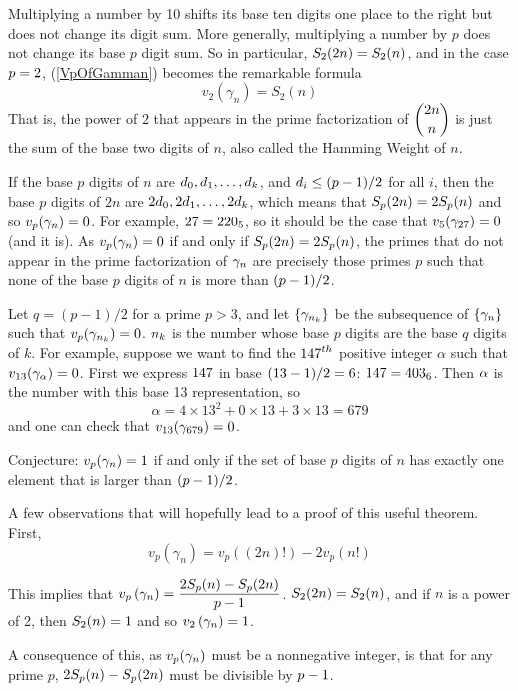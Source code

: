 Multiplying a number by 10 shifts its base ten digits one place to the right but does not change its digit sum. More generally, multiplying a number by $p$ does not change its base $p$ digit sum. So in particular, $\displaystyle S_2(2n) = S_2(n)$, and in the case $\displaystyle p=2$, (\ref{VpOfGamman}) becomes the remarkable formula
\[
  v_2(\gamma_n) = S_2(n)
\]
That is, the power of $2$ that appears in the prime factorization of $\displaystyle \binom{2n}{n}$ is just the sum of the base two digits of $n$, also called the Hamming Weight of $n$.


\iffalse
If the base $p$ digits of $n$ are $\displaystyle d_0, d_1, \ldots, d_k$, and $\displaystyle d_i \leq (p-1)/2$ for all $i$, then the base $p$ digits of $2n$ are $\displaystyle 2d_0, 2d_1, \ldots, 2d_k$, which means that $\displaystyle S_p(2n) = 2 S_p(n)$ and so $\displaystyle v_p(\gamma_n)=0$. For example, $\displaystyle 27=220_5$, so it should be the case that $\displaystyle v_5(\gamma_{27}) =0$ (and it is). As $\displaystyle v_p(\gamma_n)=0$ if and only if $\displaystyle S_p(2n) = 2 S_p(n)$, the primes that do not appear in the prime factorization of $\displaystyle \gamma_n$ are precisely those primes $p$ such that none of the base $p$ digits of $n$ is more than $\displaystyle (p-1)/2$.

Let $q = (p-1)/2$ for a prime $p>3$, and let $\displaystyle \left\{ \gamma_{n_k} \right\}$ be the subsequence of $\displaystyle \left\{ \gamma_n \right\}$ such that $\displaystyle v_p(\gamma_{n_k})=0$. $\displaystyle n_k$ is the number whose base $p$ digits are the base $q$ digits of $k$. For example, suppose we want to find the $\displaystyle 147^{th}$ positive integer $\alpha$ such that $\displaystyle v_{13}(\gamma_{\alpha})=0$. First we express $\displaystyle 147$ in base $\displaystyle (13-1)/2=6$: $\displaystyle 147 = 403_6$. Then $\displaystyle \alpha$ is the number with this base 13 representation, so 
\[
  \alpha = 4\times 13^2 + 0\times 13 + 3\times 13 = 679
\]
and one can check that $\displaystyle v_{13}(\gamma_{679}) = 0$.

Conjecture: $\displaystyle v_p(\gamma_n) = 1$ if and only if the set of base $p$ digits of $n$ has exactly one element that is larger than $\displaystyle (p-1)/2$.



A few observations that will hopefully lead to a proof of this useful theorem. First,  
\[
  v_p(\gamma_n) = v_p( (2n)!) - 2 v_p(n!)
\]

This implies that $\displaystyle v_p\left( \gamma_n \right) = \frac{2 S_p(n) - S_p(2n)}{p-1}$. $\displaystyle S_2(2n) = S_2(n)$, and if $n$ is a power of 2, then $\displaystyle S_2(n)=1$ and so $\displaystyle v_2 \left( \gamma_n \right) = 1$.

A consequence of this, as $\displaystyle v_p(\gamma_n)$ must be a nonnegative integer, is that for any prime $p$, $\displaystyle 2 S_p(n) - S_p(2n)$ must be divisible by $\displaystyle p-1$.





